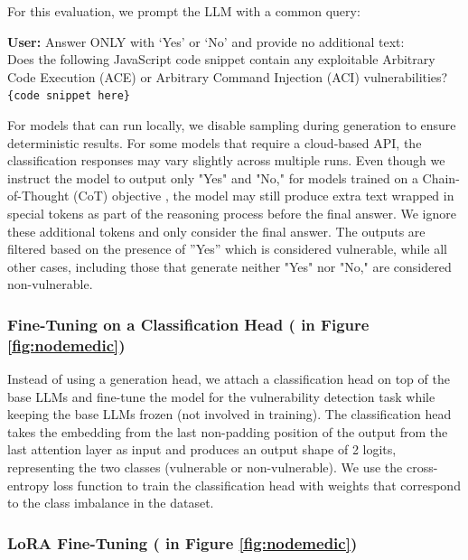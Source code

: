 \documentclass[12pt,openany,oneside,table]{cmuthesis}
\begin{document}
For this evaluation, we prompt the LLM with a common query:
\begin{tcolorbox}[colback=gray!10, colframe=black, arc=3mm, boxrule=0.8pt]
    \textbf{User:} Answer ONLY with ‘Yes’ or ‘No’ and provide no additional text:\\
    Does the following JavaScript code snippet contain any exploitable Arbitrary Code Execution (ACE) or Arbitrary Command Injection (ACI) vulnerabilities?\\
    
    \texttt{\{code snippet here\}}
\end{tcolorbox}

For models that can run locally, we disable sampling during generation to ensure deterministic results. For some models that require a cloud-based API, the classification responses may vary slightly across multiple runs. 
Even though we instruct the model to output only "Yes" and "No," for models trained on a Chain-of-Thought (CoT) objective \cite{wei2022chain}, the model may still produce extra text wrapped in special tokens as part of the reasoning process before the final answer. We ignore these additional tokens and only consider the final answer.
%
The outputs are filtered based on the presence of ''Yes'' which is considered vulnerable, while all other cases, including those that generate neither "Yes" nor "No," are considered non-vulnerable.

\subsubsection{Fine-Tuning on a Classification Head \textup{( in Figure \ref{fig:nodemedic})}}

Instead of using a generation head, we attach a classification head on top of the base LLMs and fine-tune the model for the vulnerability detection task while keeping the base LLMs frozen (not involved in training). The classification head takes the embedding from the last non-padding position of the output from the last attention layer as input and produces an output shape of 2 logits, representing the two classes (vulnerable or non-vulnerable). We use the cross-entropy loss function to train the classification head with weights that correspond to the class imbalance in the dataset.

\subsubsection{LoRA Fine-Tuning \textup{( in Figure \ref{fig:nodemedic})}}
\end{document}
